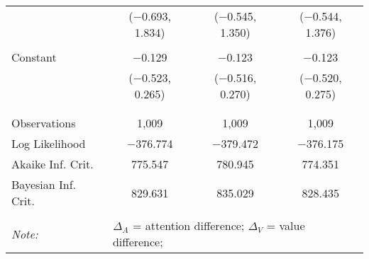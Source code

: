 \begin{table}[h]
\begin{tabular}{@{\extracolsep{5pt}}lccc}
  & ($-$0.693, 1.834) & ($-$0.545, 1.350) & ($-$0.544, 1.376) \\ 
  & & & \\ 
 Constant & $-$0.129 & $-$0.123 & $-$0.123 \\ 
  & ($-$0.523, 0.265) & ($-$0.516, 0.270) & ($-$0.520, 0.275) \\ 
  & & & \\ 
\hline \\[-1.8ex] 
Observations & 1,009 & 1,009 & 1,009 \\ 
Log Likelihood & $-$376.774 & $-$379.472 & $-$376.175 \\ 
Akaike Inf. Crit. & 775.547 & 780.945 & 774.351 \\ 
Bayesian Inf. Crit. & 829.631 & 835.029 & 828.435 \\ 
\hline 
\hline \\[-1.8ex] 
\textit{Note:}  & \multicolumn{3}{l}{\footnotesize $\Delta_A$ = attention difference; $\Delta_V$ = value difference; } \\ 
\end{tabular} 
\end{table} 
